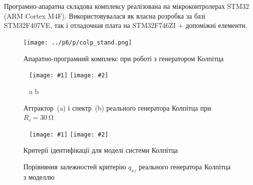 \documentclass[14pt,handout,utf8]{beamer}
\newlength\DDP
\newcommand{\ABlbl}{%
  \vspace{-2.7ex}
  \begin{center}
    ~ \hfill a \hfill\hfill b \hfill ~
  \end{center}
  \vspace{-2.0ex}
}
\newcommand{\PicDoubleS}[2]{%
 \begin{center}
    ~ \hfill
    \texttt{[image: \#1]}
    \hfill
    \texttt{[image: \#2]}
    \hfill ~
  \end{center}
  \ABlbl
}
\newcommand{\PicDoubleNL}[2]{%
 \begin{center}
    ~ \hfill
    \texttt{[image: \#1]}
    \hfill
    \texttt{[image: \#2]}
    \hfill ~
  \end{center}
}
\begin{document}

\begin{frame}
  \frametitle{~}

  Програмно-апаратна складова комплексу реалізована на
  мікроконтролерах STM32 (ARM Cortex M4F). Використовувалася як власна
  розробка за базі STM32F407VE, так і отладочная плата на STM32F746ZI +
  допоміжні елементи.

  \begin{figure}[ht!]
    \centerline{\texttt{[image: ../p6/p/colp\_stand.png]} }
    \caption{Апаратно-програмний комплекс при роботі з генератором Колпітца}
    \label{atu:colp_stand}
  \end{figure}

  \vspace{-5ex}

  \begin{figure}[htb!]
    \PicDoubleS{../p6/p/r/v1iv2_030000.png}{../p6/p/r/f_030000.png}
    \caption{Аттрактор~(a) і спектр~(b) реального генератора Колпітца при $R_c = \SI{30}{\ohm} $}
    \label{atu:f:colp_r_attr_f_30}
  \end{figure}

  \vspace{-3ex}

  \begin{figure}[htb!]
    \PicDoubleNL{../p6/p/colp_bjt_q-p_Rc_q.png}{../p6/p/colp_q_cml.png}
    \parbox[t]{\DDP} {
      \caption{Критерії ідентифікації для моделі системи Колпітца}
      \label{atu:f:colp_bjt_q-p_Rc_q}
    }
    \hfill
    \parbox[t]{\DDP} {
      \caption{Порівняння залежностей критерію $q_{xz}$ реального генератора Колпітца з моделлю}
      \label{atu:f:colp_q_cml}
    }
  \end{figure}


\end{frame}


\end{document}
